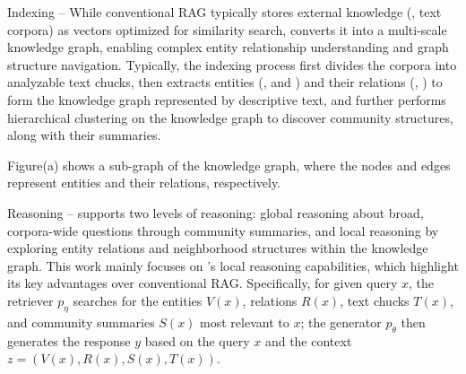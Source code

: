 
Indexing -- While conventional RAG typically stores external knowledge (\meg, text corpora) as vectors optimized for similarity search, \rag converts it into a multi-scale knowledge graph, enabling complex entity relationship understanding and graph structure navigation. Typically, the indexing process first divides the corpora into analyzable text chucks, then extracts entities (\meg,  and ) and their relations (\meg, ) to form the knowledge graph represented by descriptive text, and further performs hierarchical clustering on the knowledge graph to discover community structures, along with their summaries. 

\begin{mtbox}{}
\begin{example}
Figure(a) shows a sub-graph of the knowledge graph, where the nodes and edges represent entities and their relations, respectively.
\end{example}
\end{mtbox}


Reasoning -- \rag supports two levels of reasoning: global reasoning about broad, corpora-wide questions through community summaries, and local reasoning by exploring entity relations and neighborhood structures within the knowledge graph. This work mainly focuses on \rag's local reasoning capabilities, which highlight its key advantages over conventional RAG. Specifically, for given query $x$, the retriever $p_\eta$ searches for the entities $V(x)$, relations $R(x)$, text chucks $T(x)$, and community summaries $S(x)$ most relevant to $x$; the generator $p_\theta$ then generates the response $y$ based on the query $x$ and the context $z = (V(x), R(x), S(x), T(x))$. 


